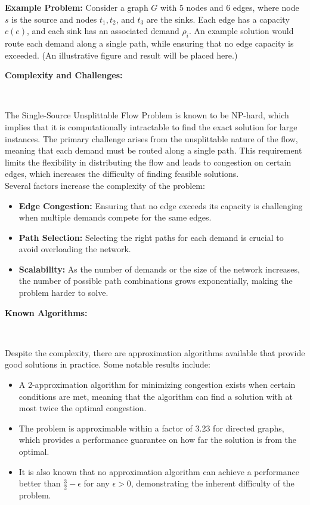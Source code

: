 \documentclass[a4paper,12pt]{article}
\begin{document}
\noindent \textbf{Example Problem:} Consider a graph $G$ with 5 nodes and 6 edges, where node $s$ is the source and nodes $t_1, t_2$, and $t_3$ are the sinks. Each edge has a capacity $c(e)$, and each sink has an associated demand $\rho_i$. An example solution would route each demand along a single path, while ensuring that no edge capacity is exceeded. (An illustrative figure and result will be placed here.)

\noindent \textbf{Complexity and Challenges:}

\

\noindent The Single-Source Unsplittable Flow Problem is known to be NP-hard, which implies that it is computationally intractable to find the exact solution for large instances. The primary challenge arises from the unsplittable nature of the flow, meaning that each demand must be routed along a single path. This requirement limits the flexibility in distributing the flow and leads to congestion on certain edges, which increases the difficulty of finding feasible solutions.
\\

\noindent Several factors increase the complexity of the problem:

\begin{itemize}
    \item \textbf{Edge Congestion:} Ensuring that no edge exceeds its capacity is challenging when multiple demands compete for the same edges.
    \item \textbf{Path Selection:} Selecting the right paths for each demand is crucial to avoid overloading the network.
    \item \textbf{Scalability:} As the number of demands or the size of the network increases, the number of possible path combinations grows exponentially, making the problem harder to solve.
\end{itemize}

\noindent \textbf{Known Algorithms:}

\

\noindent Despite the complexity, there are approximation algorithms available that provide good solutions in practice. Some notable results include:
\begin{itemize}
    \item A 2-approximation algorithm for minimizing congestion exists when certain conditions are met, meaning that the algorithm can find a solution with at most twice the optimal congestion.
    \item The problem is approximable within a factor of 3.23 for directed graphs, which provides a performance guarantee on how far the solution is from the optimal.
    \item It is also known that no approximation algorithm can achieve a performance better than \( \frac{3}{2} - \epsilon \) for any $\epsilon > 0$, demonstrating the inherent difficulty of the problem.
\end{itemize}
\end{document}
